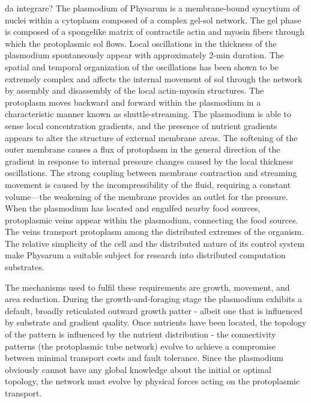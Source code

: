 \par
da integrare? The plasmodium of Physarum is a membrane-bound syncytium of nuclei within a cytoplasm composed of a complex gel-sol network. The gel phase is composed of a spongelike matrix of contractile actin and myosin fibers through which the protoplasmic sol flows. Local oscillations in the thickness of the plasmodium spontaneously appear with approximately 2-min duration. The spatial and temporal organization of the oscillations has been shown to be extremely complex and affects the internal movement of sol through the network by assembly and disassembly of the local actin-myosin structures. The protoplasm moves backward and forward within the plasmodium in a characteristic manner known as shuttle-streaming.
The plasmodium is able to sense local concentration gradients, and the presence of nutrient gradients appears to alter the structure of external membrane areas. The softening of the outer membrane causes a flux of protoplasm in the general direction of the gradient in response to internal pressure changes caused by the local thickness oscillations. The strong coupling between membrane contraction and streaming movement is caused by the incompressibility of the fluid, requiring a constant volume—the weakening of the membrane provides an outlet for the pressure. When the plasmodium has located and engulfed nearby food sources, protoplasmic veins appear within the plasmodium, connecting the food sources. The veins transport protoplasm among the distributed extremes of the organism.
The relative simplicity of the cell and the distributed nature of its control system make Physarum a suitable subject for research into distributed computation substrates. \cite{jones2010characteristics}

The mechanisms used to fulfil these requirements are growth, movement, and area reduction. During the growth-and-foraging stage the plasmodium exhibits a default, broadly reticulated outward growth patter - albeit one that is influenced by substrate and gradient quality. Once nutrients have been located, the topology of the pattern is influenced by the nutrient distribution - the connectivity patterns (the protoplasmic tube network) evolve to achieve a compromise between minimal transport costs and
fault tolerance. Since the plasmodium obviously cannot have any global knowledge about the initial or optimal topology, the network must evolve by physical forces acting on the protoplasmic transport.